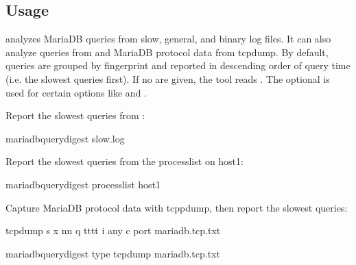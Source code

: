 \documentclass[letterpaper,10pt,english]{sphinxmanual}
\begin{document}
\subsection{Usage}
\label{\detokenize{mariadb-query-digest:usage}}
\begin{sphinxVerbatim}[commandchars=\\\{\}]
 \PYG{p}{[}\PYG{p}{]} \PYG{p}{[}\PYG{p}{]} \PYG{p}{[}\PYG{p}{]}
\end{sphinxVerbatim}

 analyzes MariaDB queries from slow, general, and binary log
files.  It can also analyze queries from  and MariaDB
protocol data from tcpdump.  By default, queries are grouped by fingerprint
and reported in descending order of query time (i.e. the slowest queries
first).  If no  are given, the tool reads .  The optional
 is used for certain options like {\hyperref[\detokenize{mariadb-query-digest:cmdoption-mariadb-query-digest-since}]{}} and {\hyperref[\detokenize{mariadb-query-digest:cmdoption-mariadb-query-digest-until}]{}}.

Report the slowest queries from :

\begin{sphinxVerbatim}[commandchars=\\\{\}]
mariadb\PYGZhy{}query\PYGZhy{}digest slow.log
\end{sphinxVerbatim}

Report the slowest queries from the processlist on host1:

\begin{sphinxVerbatim}[commandchars=\\\{\}]
mariadb\PYGZhy{}query\PYGZhy{}digest \PYGZhy{}\PYGZhy{}processlist host1
\end{sphinxVerbatim}

Capture MariaDB protocol data with tcppdump, then report the slowest queries:

\begin{sphinxVerbatim}[commandchars=\\\{\}]
tcpdump \PYGZhy{}s  \PYGZhy{}x \PYGZhy{}nn \PYGZhy{}q \PYGZhy{}tttt \PYGZhy{}i any \PYGZhy{}c  port  \PYGZgt{} mariadb.tcp.txt

mariadb\PYGZhy{}query\PYGZhy{}digest \PYGZhy{}\PYGZhy{}type tcpdump mariadb.tcp.txt
\end{sphinxVerbatim}
\end{document}
